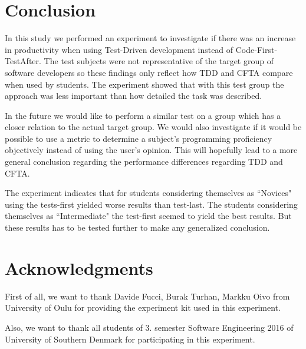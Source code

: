 \documentclass{sig-alternate-05-2015}
\begin{document}
\section{Conclusion}
\label{sec:Conclusion}
In this study we performed an experiment to investigate if there was an increase in productivity when using Test-Driven development instead of Code-First-TestAfter. The test subjects were not representative of the target group of software developers so these findings only reflect how TDD and CFTA compare when used by students. The experiment showed that with this test group the approach was less important than how detailed the task was described.

In the future we would like to perform a similar test on a group which has a closer relation to the actual target group. We would also investigate if it would be possible to use a metric to determine a subject's programming proficiency objectively instead of using the user's opinion. This will hopefully lead to a more general conclusion regarding the performance differences regarding TDD and CFTA.

The experiment indicates that for students considering themselves as ``Novices" using the tests-first yielded worse results than test-last. The students considering themselves as ``Intermediate" the test-first seemed to yield the best results. But these results has to be tested further to make any generalized conclusion.





\section{Acknowledgments}

First of all, we want to thank Davide Fucci, Burak Turhan, Markku Oivo from University of Oulu for providing the experiment kit used in this experiment.

Also, we want to thank all students of 3. semester Software Engineering 2016 of University of Southern Denmark for participating in this experiment.
\end{document}
